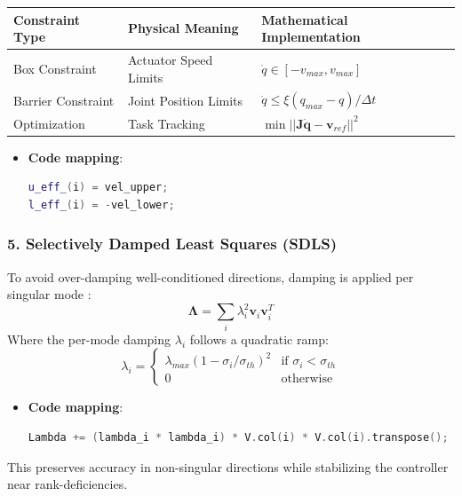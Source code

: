 \documentclass[12pt,a4paper]{report}
\begin{document}
\begin{table}[H]
\centering
\begin{tabular}{|l|l|l|}
\hline
\textbf{Constraint Type} & \textbf{Physical Meaning} & \textbf{Mathematical Implementation} \\ \hline
Box Constraint & Actuator Speed Limits & $\dot{q} \in [-v_{max}, v_{max}]$ \\ \hline
Barrier Constraint & Joint Position Limits & $\dot{q} \le \xi (q_{max} - q) / \Delta t$ \\ \hline
Optimization & Task Tracking & $\min || \mathbf{J}\dot{\mathbf{q}} - \mathbf{v}_{ref} ||^2$ \\ \hline
\end{tabular}
\end{table}

\begin{itemize}
    \item \textbf{Code mapping}:
\begin{lstlisting}[language=C++]
u_eff_(i) = vel_upper;
l_eff_(i) = -vel_lower;
\end{lstlisting}
\end{itemize}

\subsubsection{5. Selectively Damped Least Squares (SDLS)}
To avoid over-damping well-conditioned directions, damping is applied per singular mode \cite{buss}:
\begin{equation}
    \mathbf{\Lambda} = \sum_{i} \lambda_i^2 \mathbf{v}_i \mathbf{v}_i^T
\end{equation}
Where the per-mode damping $\lambda_i$ follows a quadratic ramp:
\begin{equation}
    \lambda_i = 
    \begin{cases} 
    \lambda_{max}(1 - \sigma_i / \sigma_{th})^2 & \text{if } \sigma_i < \sigma_{th} \\
    0 & \text{otherwise}
    \end{cases}
\end{equation}
\begin{itemize}
    \item \textbf{Code mapping}:
\begin{lstlisting}[language=C++]
Lambda += (lambda_i * lambda_i) * V.col(i) * V.col(i).transpose();
\end{lstlisting}
\end{itemize}
This preserves accuracy in non-singular directions while stabilizing the controller near rank-deficiencies.
\end{document}
